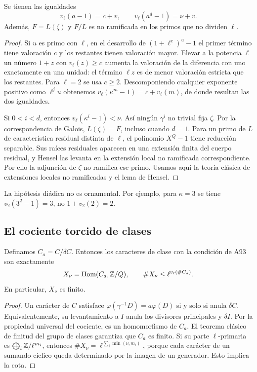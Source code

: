 \begin{lema}
\label{lem:cu-lte}
Se tienen las igualdades
\begin{equation}
 v_\ell(a-1)=c+v,\qquad v_\ell(a^d-1)=\nu+v.
 \label{eq:cu-lte}
\end{equation}
Además, $F=L(\zeta)$ y $F/L$ es no ramificada en los primos que no dividen $\ell$.
\end{lema}
\begin{proof}
Si $u$ es primo con $\ell$, en el desarrollo de $(1+\ell^c)^u-1$ el primer término tiene valoración $c$ y los restantes tienen valoración mayor. Elevar a la potencia $\ell$ un número $1+z$ con $v_\ell(z)\ge c$ aumenta la valoración de la diferencia con uno exactamente en una unidad: el término $\ell z$ es de menor valoración estricta que los restantes. Para $\ell=2$ se usa $c\ge2$. Descomponiendo cualquier exponente positivo como $\ell^j u$ obtenemos $v_\ell(\kappa^m-1)=c+v_\ell(m)$, de donde resultan las dos igualdades.

Si $0<i<d$, entonces $v_\ell(\kappa^i-1)<\nu$. Así ningún $\gamma^i$ no trivial fija $\zeta$. Por la correspondencia de Galois, $L(\zeta)=F$, incluso cuando $d=1$. Para un primo de $L$ de característica residual distinta de $\ell$, el polinomio $X^Q-1$ tiene reducción separable. Sus raíces residuales aparecen en una extensión finita del cuerpo residual, y Hensel las levanta en la extensión local no ramificada correspondiente. Por ello la adjunción de $\zeta$ no ramifica ese primo. Usamos aquí la teoría clásica de extensiones locales no ramificadas y el lema de Hensel.
\end{proof}

La hipótesis diádica no es ornamental. Por ejemplo, para $\kappa=3$ se tiene $v_2(3^2-1)=3$, no $1+v_2(2)=2$.

\subsection{El cociente torcido de clases}

\begin{proposicion}
\label{prop:cu-clases}
Definamos $C_a=C/\delta C$. Entonces los caracteres de clase con la condición de A93 son exactamente
\begin{equation}
 X_\nu=\operatorname{Hom}(C_a,\mathbb{Z}/Q),
 \qquad \#X_\nu\le \ell^{v_\ell(\#C_a)}.
 \label{eq:cu-x}
\end{equation}
En particular, $X_\nu$ es finito.
\end{proposicion}
\begin{proof}
Un carácter de $C$ satisface $\varphi(\gamma^{-1}D)=a\varphi(D)$ si y solo si anula $\delta C$. Equivalentemente, su levantamiento a $I$ anula los divisores principales y $\delta I$. Por la propiedad universal del cociente, es un homomorfismo de $C_a$. El teorema clásico de finitud del grupo de clases garantiza que $C_a$ es finito. Si su parte $\ell$-primaria es $\bigoplus_i\mathbb{Z}/\ell^{m_i}$, entonces $\#X_\nu=\ell^{\sum_i\min(\nu,m_i)}$, porque cada carácter de un sumando cíclico queda determinado por la imagen de un generador. Esto implica la cota.
\end{proof}

